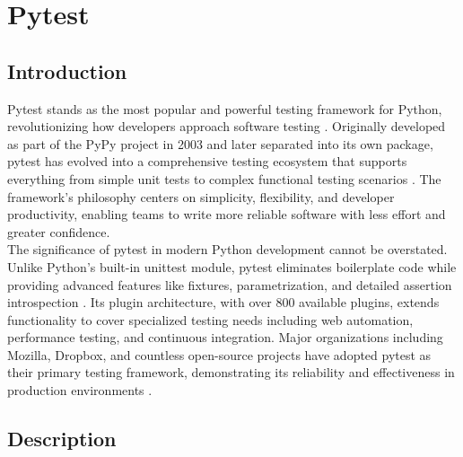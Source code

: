 %
%
%


%
%

\chapter{Pytest}
\label{ch:pytest}

\section{Introduction}
\label{sec:intro}

Pytest stands as the most popular and powerful testing framework for Python, revolutionizing how developers approach software testing \cite{Pytest:2024}. Originally developed as part of the PyPy project in 2003 and later separated into its own package, pytest has evolved into a comprehensive testing ecosystem that supports everything from simple unit tests to complex functional testing scenarios \cite{RealPython:2024}. The framework's philosophy centers on simplicity, flexibility, and developer productivity, enabling teams to write more reliable software with less effort and greater confidence.\\

The significance of pytest in modern Python development cannot be overstated. Unlike Python's built-in unittest module, pytest eliminates boilerplate code while providing advanced features like fixtures, parametrization, and detailed assertion introspection \cite{GeeksforGeeks:2024}. Its plugin architecture, with over 800 available plugins, extends functionality to cover specialized testing needs including web automation, performance testing, and continuous integration. Major organizations including Mozilla, Dropbox, and countless open-source projects have adopted pytest as their primary testing framework, demonstrating its reliability and effectiveness in production environments \cite{WikiPytest:2024}.\\

\section{Description}
\label{sec:description}

